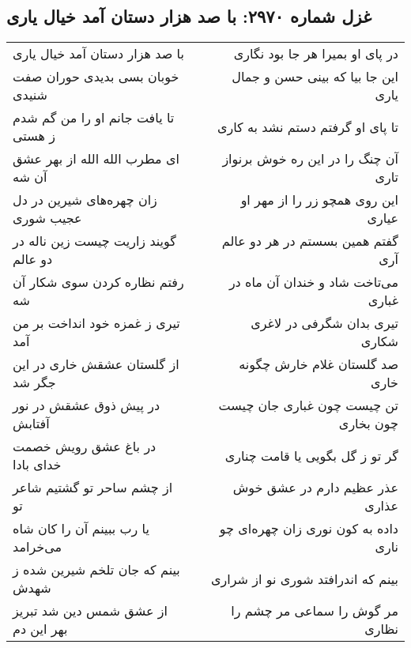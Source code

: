\begin{center}
\section*{غزل شماره ۲۹۷۰: با صد هزار دستان آمد خیال یاری}
\label{sec:2970}
\begin{longtable}{l p{0.5cm} r}
با صد هزار دستان آمد خیال یاری
&&
در پای او بمیرا هر جا بود نگاری
\\
خوبان بسی بدیدی حوران صفت شنیدی
&&
این جا بیا که بینی حسن و جمال یاری
\\
تا یافت جانم او را من گم شدم ز هستی
&&
تا پای او گرفتم دستم نشد به کاری
\\
ای مطرب الله الله از بهر عشق آن شه
&&
آن چنگ را در این ره خوش برنواز تاری
\\
زان چهره‌های شیرین در دل عجیب شوری
&&
این روی همچو زر را از مهر او عیاری
\\
گویند زاریت چیست زین ناله در دو عالم
&&
گفتم همین بسستم در هر دو عالم آری
\\
رفتم نظاره کردن سوی شکار آن شه
&&
می‌تاخت شاد و خندان آن ماه در غباری
\\
تیری ز غمزه خود انداخت بر من آمد
&&
تیری بدان شگرفی در لاغری شکاری
\\
از گلستان عشقش خاری در این جگر شد
&&
صد گلستان غلام خارش چگونه خاری
\\
در پیش ذوق عشقش در نور آفتابش
&&
تن چیست چون غباری جان چیست چون بخاری
\\
در باغ عشق رویش خصمت خدای بادا
&&
گر تو ز گل بگویی یا قامت چناری
\\
از چشم ساحر تو گشتیم شاعر تو
&&
عذر عظیم دارم در عشق خوش عذاری
\\
یا رب ببینم آن را کان شاه می‌خرامد
&&
داده به کون نوری زان چهره‌ای چو ناری
\\
بینم که جان تلخم شیرین شده ز شهدش
&&
بینم که اندرافتد شوری نو از شراری
\\
از عشق شمس دین شد تبریز بهر این دم
&&
مر گوش را سماعی مر چشم را نظاری
\\
\end{longtable}
\end{center}
